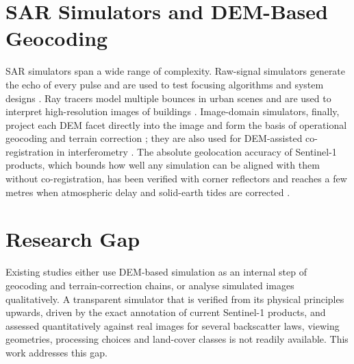 \section{SAR Simulators and DEM-Based Geocoding}
SAR simulators span a wide range of complexity. Raw-signal simulators generate the echo of every pulse and are used to
test focusing algorithms and system designs \cite{franceschetti1992}. Ray tracers model multiple bounces in urban
scenes and are used to interpret high-resolution images of buildings \cite{balz2009,auer2010}. Image-domain
simulators, finally, project each DEM facet directly into the image and form the basis of operational geocoding and
terrain correction \cite{schreier1993,meier1993,small2011,low2007}; they are also used for DEM-assisted co-registration
in interferometry \cite{nitti2011,bamler1998}. The absolute geolocation accuracy of Sentinel-1 products, which bounds
how well any simulation can be aligned with them without co-registration, has been verified with corner reflectors and
reaches a few metres when atmospheric delay and solid-earth tides are corrected \cite{schubert2015,gisinger2021}.

\section{Research Gap}
Existing studies either use DEM-based simulation as an internal step of geocoding and terrain-correction chains, or
analyse simulated images qualitatively. A transparent simulator that is verified from its physical principles upwards,
driven by the exact annotation of current Sentinel-1 products, and assessed quantitatively against real images for
several backscatter laws, viewing geometries, processing choices and land-cover classes is not readily available. This
work addresses this gap.
